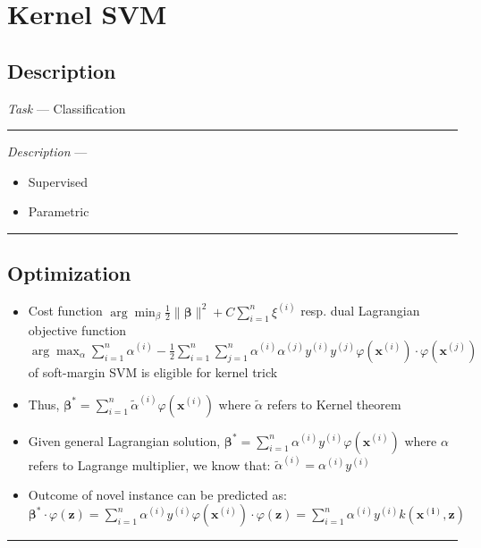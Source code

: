 \section{Kernel SVM}
\subsection*{Description}
\emph{Task} --- Classification

{\color{lightgray}\hrule height 0.001mm}

\emph{Description} --- 
\begin{itemize}
    \item Supervised
    \item Parametric
\end{itemize}

{\color{black}\hrule height 0.001mm}

\subsection*{Optimization}
\begin{itemize}
    \item Cost function $\arg\min_\beta \frac{1}{2} \| \boldsymbol{\beta} \|^2 + C \sum_{i=1}^n \xi^{(i)}$ resp. dual Lagrangian objective function $\arg\max_\alpha \sum_{i=1}^n \alpha^{(i)} - \frac{1}{2}  \sum_{i=1}^n  \sum_{j=1}^n \alpha^{(i)}\alpha^{(j)} y^{(i)}y^{(j)} \varphi(\boldsymbol{x}^{(i)}) \cdot \varphi(\boldsymbol{x}^{(j)})$ of soft-margin SVM is eligible for kernel trick
    \item Thus, $\boldsymbol{\beta}^{*} = \sum_{i=1}^n \tilde{\alpha}^{(i)} \varphi(\boldsymbol{x}^{(i)})$ where $\tilde{\alpha}$ refers to Kernel theorem
    \item Given general Lagrangian solution, $\boldsymbol{\beta}^{*} = \sum_{i=1}^n \alpha^{(i)} y^{(i)} \varphi(\boldsymbol{x}^{(i)}) $ where $\alpha$ refers to Lagrange multiplier, we know that: $\tilde{\alpha}^{(i)} = \alpha^{(i)} y^{(i)}$
    \item Outcome of novel instance can be predicted as: $\boldsymbol{\beta}^{*} \cdot \varphi({\boldsymbol{z}}) = \sum_{i=1}^n \alpha^{(i)} y^{(i)} \varphi(\boldsymbol{x}^{(i)}) \cdot \varphi({\boldsymbol{z}}) = \sum_{i=1}^n \alpha^{(i)} y^{(i)} k(\boldsymbol{x^{(i)}}, \boldsymbol{z})$
\end{itemize}

{\color{black}\hrule height 0.001mm}

